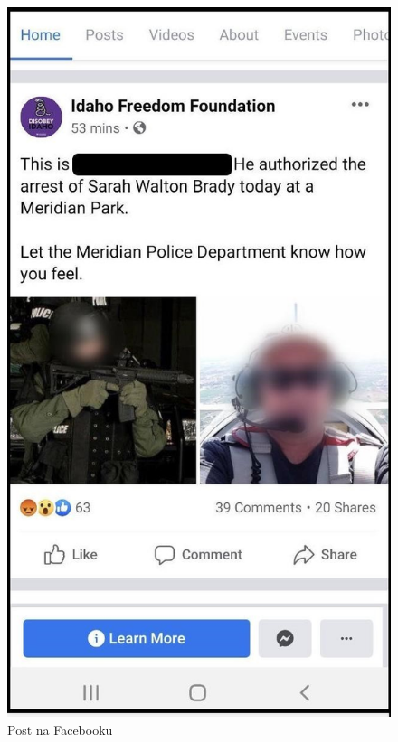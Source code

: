 \begin{figure}
  \centering
  \includegraphics[width=1\textwidth]{images/officer.jpg}
  \caption{Post na Facebooku}
  \label{fig:officer}
\end{figure} 

